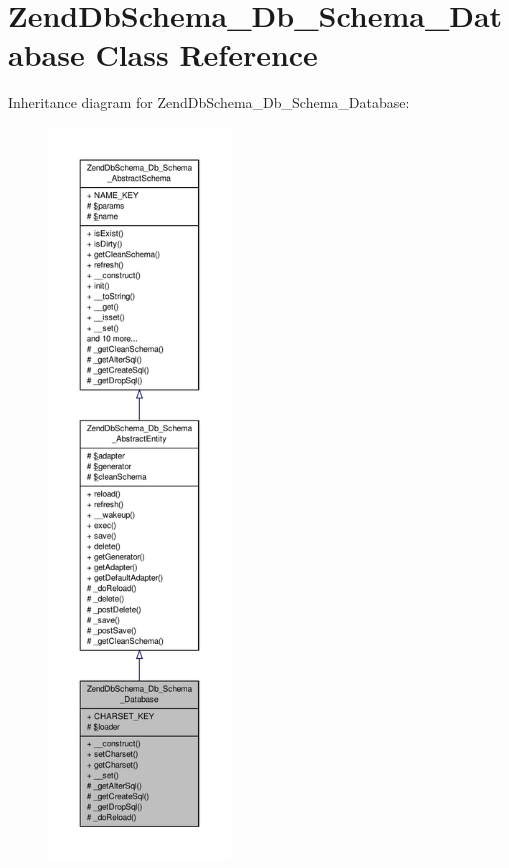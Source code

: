 \hypertarget{classZendDbSchema__Db__Schema__Database}{\section{Zend\-Db\-Schema\-\_\-\-Db\-\_\-\-Schema\-\_\-\-Database Class Reference}
\label{classZendDbSchema__Db__Schema__Database}
}


Inheritance diagram for Zend\-Db\-Schema\-\_\-\-Db\-\_\-\-Schema\-\_\-\-Database\-:\nopagebreak
\begin{figure}[H]
\begin{center}
\leavevmode
\includegraphics[height=550pt]{classZendDbSchema__Db__Schema__Database__inherit__graph}
\end{center}
\end{figure}


